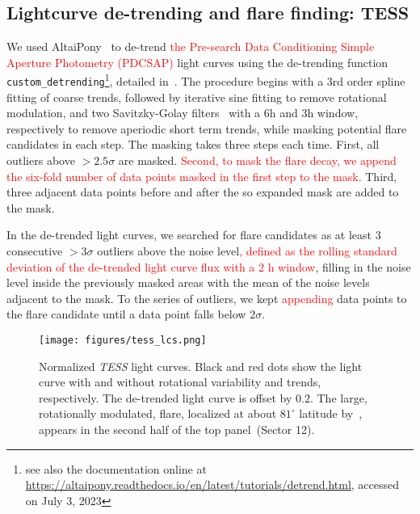 \documentclass[twocolumn]{aastex631}
\begin{document}
\subsection{Lightcurve de-trending and flare finding: TESS}
\label{sec:methods:tess}
We used AltaiPony~\citep{ilin2021altaipony} to de-trend \textcolor{red}{the Pre-search Data Conditioning Simple Aperture Photometry (PDCSAP)} light curves using the de-trending function \texttt{custom\_detrending}\footnote{see also the documentation online at \url{https://altaipony.readthedocs.io/en/latest/tutorials/detrend.html}, accessed on July 3, 2023}, detailed in~\citet{ilin2022searching}. The procedure begins with a 3rd order spline fitting of coarse trends, followed by iterative sine fitting to remove rotational modulation, and two Savitzky-Golay filters~\citep{savitzky1964smoothing} with a 6h and 3h window, respectively to remove aperiodic short term trends, while masking potential flare candidates in each step. The masking takes three steps each time. First, all outliers above $>2.5\sigma$ are masked. \textcolor{red}{Second, to mask the flare decay, we append the six-fold number of data points masked in the first step to the mask.} Third, three adjacent data points before and after the so expanded mask are added to the mask. 

In the de-trended light curves, we searched for flare candidates as at least 3 consecutive $>3\sigma$ outliers above the noise level\textcolor{red}{, defined as the rolling standard deviation of the de-trended light curve flux with a 2 h window}, filling in the noise level inside the previously masked areas with the mean of the noise levels adjacent to the mask. To the series of outliers, we kept \textcolor{red}{appending} data points to the flare candidate until a data point falls below $2\sigma$. 

\begin{figure*}
    \begin{centering}
        \texttt{[image: figures/tess\_lcs.png]}
        \caption{
         Normalized \textit{TESS} light curves. Black and red dots show the light curve with and without rotational variability and trends, respectively. The de-trended light curve is offset by $0.2$. The large, rotationally modulated, flare, localized at about $81^{\circ}$ latitude by~\citet{ilin2021giant}, appears in the second half of the top panel~(Sector 12).}
        \label{fig:tess_lcs}
    \end{centering}
\end{figure*}
\end{document}
